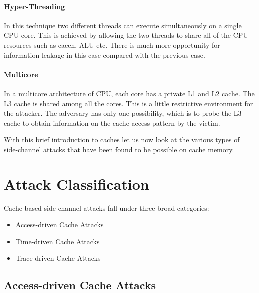 \documentclass[onecolumn]{IEEEtran}
\begin{document}
\paragraph{Hyper-Threading} In this technique two different threads
can execute simultaneously on a single CPU core.  This is achieved by
allowing the two threads to share all of the CPU resources such as
caceh, ALU etc.  There is much more opportunity for information
leakage in this case compared with the previous case.

\paragraph{Multicore} In a multicore architecture of CPU, each core
has a private L1 and L2 cache.  The L3 cache is shared among all the
cores.  This is a little restrictive environment for the attacker.
The adversary has only one possibility, which is to probe the L3 cache
to obtain information on the cache access pattern by the victim.

With this brief introduction to caches let us now look at the various
types of side-channel attacks that have been found to be possible on
cache memory.

\section{Attack Classification}

Cache based side-channel attacks fall under three broad categories:

\begin{itemize}
\item Access-driven Cache Attacks
\item Time-driven Cache Attacks
\item Trace-driven Cache Attacks
\end{itemize}

\subsection{Access-driven Cache Attacks}
\end{document}
